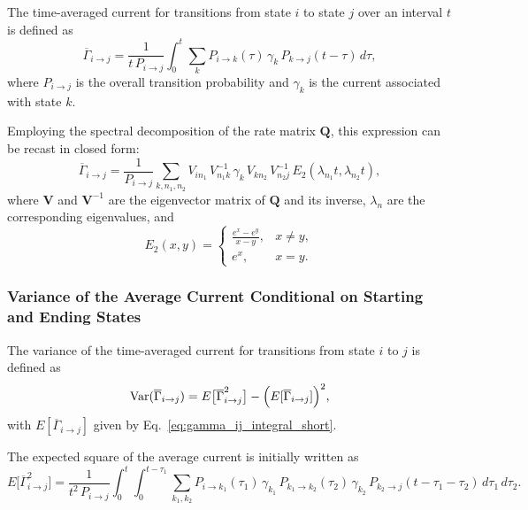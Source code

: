 \documentclass[pdflatex,sn-nature]{sn-jnl}%
\theoremstyle{thmstyleone}%
\theoremstyle{thmstyletwo}%
\theoremstyle{thmstylethree}%
\begin{document}
The time-averaged current for transitions from state \(i\) to state \(j\) over an interval \(t\) is defined as
\begin{equation}
	\overline{\Gamma}_{i \rightarrow j} = \frac{1}{t\,P_{i\rightarrow j}} \int_0^t \sum_k P_{i\rightarrow k}(\tau)\,\gamma_k\,P_{k\rightarrow j}(t-\tau)\,d\tau,
	\label{eq:gamma_ij_integral_short}
\end{equation}
where \(P_{i\rightarrow j}\) is the overall transition probability and \(\gamma_k\) is the current associated with state \(k\).

Employing the spectral decomposition of the rate matrix \(\mathbf{Q}\), this expression can be recast in closed form:
\begin{equation}
	\overline{\Gamma}_{i \rightarrow j} = \frac{1}{P_{i\rightarrow j}} \sum_{k, n_1, n_2} V_{i n_1}\,V^{-1}_{n_1 k}\,\gamma_k\,V_{k n_2}\,V^{-1}_{n_2 j}\,E_2(\lambda_{n_1}t,\lambda_{n_2}t),
	\label{eq:gamma_ij_formula_short}
\end{equation}
where \(\mathbf{V}\) and \(\mathbf{V}^{-1}\) are the eigenvector matrix of \(\mathbf{Q}\) and its inverse, \(\lambda_{n}\) are the corresponding eigenvalues, and
\begin{equation}
	E_2(x,y)=
	\begin{cases}
		\frac{e^x-e^y}{x-y}, & x\neq y, \\
		e^x, & x=y.
	\end{cases}
	\label{eq:E2_short}
\end{equation}


\subsubsection{Variance of the Average Current Conditional on Starting and Ending States}

The variance of the time-averaged current for transitions from state \(i\) to \(j\) is defined as
\begin{equation}
\mathrm{Var}(\overline{\Gamma}_{i\rightarrow j}) = E\bigl[\overline{\Gamma}_{i\rightarrow j}^2\bigr] - \Bigl(E[\overline{\Gamma}_{i\rightarrow j}]\Bigr)^2,
\label{eq:variance_gamma_short}
	\end{equation}
	with \(E[\overline{\Gamma}_{i\rightarrow j}]\) given by Eq.~\ref{eq:gamma_ij_integral_short}.

The expected square of the average current is initially written as
\begin{equation}
E\bigl[\overline{\Gamma}_{i\rightarrow j}^2\bigr] = \frac{1}{t^2\,P_{i\rightarrow j}} \int_0^t\int_0^{t-\tau_1} \sum_{k_1,k_2} P_{i\rightarrow k_1}(\tau_1)\,\gamma_{k_1}\,P_{k_1\rightarrow k_2}(\tau_2)\,\gamma_{k_2}\,P_{k_2\rightarrow j}(t-\tau_1-\tau_2)\,d\tau_1\,d\tau_2.
\label{eq:expected_square_integral_short}
\end{equation}
\end{document}
